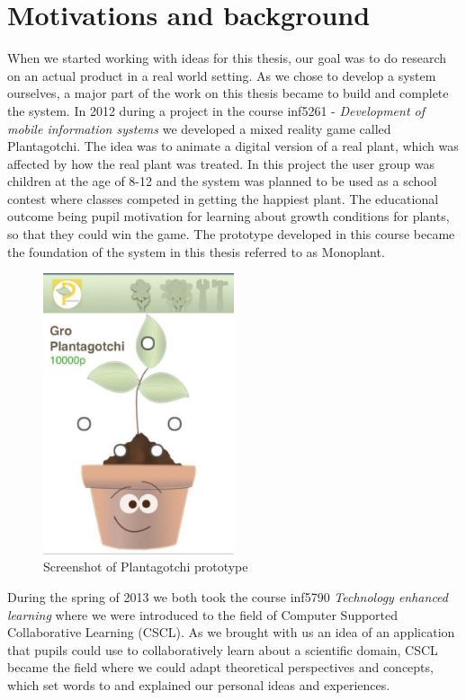 \section{Motivations and background}
When we started working with ideas for this thesis, our goal was to do research on an actual product in a real world setting. As we chose to develop a system ourselves, a major part of the work on this thesis became to build and complete the system. In 2012 during a project in the course inf5261 - \emph{Development of mobile information systems} we developed a mixed reality game called Plantagotchi. The idea was to animate a digital version of a real plant, which was affected by how the real plant was treated. In this project the user group was children at the age of 8-12 and the system was planned to be used as a school contest where classes competed in getting the happiest plant. The educational outcome being pupil motivation for learning about growth conditions for plants, so that they could win the game. The prototype developed in this course became the foundation of the system in this thesis referred to as Monoplant.

\begin{figure}
\centering
\includegraphics[width=0.5\textwidth]{img/introduction/plantagotchi.jpg}
\caption{Screenshot of Plantagotchi prototype}
\label{fig:scrshotplantagotchi}
\end{figure}

During the spring of 2013 we both took the course inf5790 \emph{Technology enhanced learning} where we were introduced to the field of Computer Supported Collaborative Learning (CSCL). As we brought with us an idea of an application that pupils could use to collaboratively learn about a scientific domain, CSCL became the field where we could adapt theoretical perspectives and concepts, which set words to and explained our personal ideas and experiences. 

